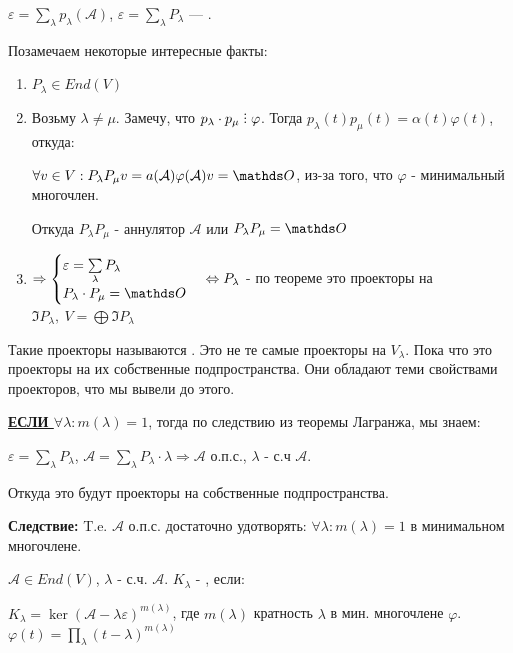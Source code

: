 $\varepsilon = \sum\limits_{\lambda}p_{\lambda}(\mathcal{A})$, $\varepsilon = \sum\limits_{\lambda}P_{\lambda}$ --- .

Позамечаем некоторые интересные факты:
\begin{enumerate}
    \item $P_{\lambda} \in End(V)$
    \item Возьму $\lambda \neq \mu$. Замечу, что $ p_{\lambda}\cdot p_{\mu} \divby \varphi$. Тогда $p_{\lambda}(t) p_{\mu}(t) = \alpha(t)\varphi(t)$, откуда:

    $\forall v \in V: P_{\lambda}P_{\mu}v =  a(\mathcal{A})\varphi(\mathcal{A})v = \zero$, из-за того, что $\varphi$ - минимальный многочлен.

    Откуда $ P_{\lambda}P_{\mu}$ - аннулятор $\mathcal{A}$ или $ P_{\lambda}P_{\mu} = \zero$

    \item $\Rightarrow \begin{cases}
    \varepsilon = \sum\limits_{\lambda}P_{\lambda}\\
    P_{\lambda}\cdot P_{\mu} =\zero
\end{cases} \Leftrightarrow P_{\lambda}$  - по теореме это проекторы на $\Im P_{\lambda} , \ V= \bigoplus \Im P_{\lambda}$
\end{enumerate}

Такие проекторы называются . Это не те самые проекторы на $V_{\lambda}$. Пока что это проекторы на их собственные подпространства. Они обладают теми свойствами проекторов, что мы вывели до этого.

\textbf{\uline{ЕСЛИ  $\forall \lambda: m(\lambda)=1$}}, тогда по следствию из теоремы Лагранжа, мы знаем:

$\varepsilon = \sum\limits_{\lambda}P_{\lambda} $, $\mathcal{A} = \sum\limits_{\lambda}P_{\lambda}\cdot \lambda \Rightarrow \mathcal{A}$ о.п.с., $\lambda$ - с.ч $\mathcal{A}$.

Откуда это будут проекторы на собственные подпространства.

\textbf{Следствие:} T.e. $\mathcal{A}$ о.п.с. достаточно удотворять: $\forall \lambda : m(\lambda) = 1$ в минимальном многочлене.

 $\mathcal{A} \in End(V)$, $\lambda$ - с.ч. $\mathcal{A}$. $K_{\lambda}$ - , если:

$K_{\lambda} = \ker (\mathcal{A}- \lambda \varepsilon)^{m(\lambda)}$, где $m(\lambda)$ кратность $\lambda$ в мин. многочлене $\varphi$. $\varphi(t)=\prod\limits_{\lambda}(t-\lambda)^{m(\lambda)}$


